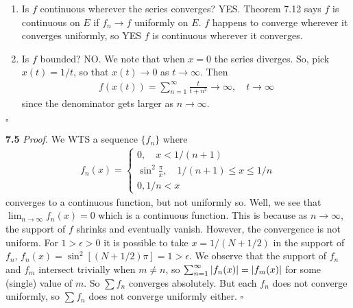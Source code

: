 \documentclass[11pt]{article}
\begin{document}
\begin{enumerate}
	
	\item Is $f$ continuous wherever the series converges? YES. Theorem 7.12 says $f$ is continuous on $E$ if $f_n \to f$ uniformly on $E$. $f$ happens to converge wherever it converges uniformly, so YES $f$ is continuous wherever it converges.  
	
	
	\item Is $f$ bounded? NO. We note that when $x=0$ the series diverges. So, pick $x(t) = 1/t$, so that $x(t) \to 0$ as $t\to \infty$. Then
	\begin{align*}
	f(x(t)) = \sum^\infty_{n=1}\frac{t}{t + n^2} \to \infty, \quad t\to \infty
	\end{align*}
	since the denominator gets larger as $n\to \infty$. 
\end{enumerate}\hfill $\square$



\noindent \textbf{7.5} 
\noindent \textit{Proof.} We WTS a sequence $\{f_n\}$ where
\begin{align*}
f_n(x) = \begin{cases}
0, \quad x<1/(n+1)\\
\sin^2\frac{\pi}{x}, \quad 1/(n+1) \leq x \leq 1/n \\
0, 1/n < x
\end{cases}
\end{align*}
converges to a continuous function, but not uniformly so. Well, we see that $\lim_{n\to \infty} f_n(x) = 0$ which is a continuous function. This is because as $n\to \infty$, the support of $f$ shrinks and eventually vanish. However, the convergence is not uniform. For $1 > \epsilon > 0$ it is possible to take $x = 1/(N+1/2)$ in the support of $f_n$, $f_n(x) = \sin^2 [(N+1/2)\pi] = 1 > \epsilon$. We observe that the support of $f_n$ and $f_m$ intersect trivially when $m\neq n$, so $\sum^\infty_{n=1} \abs{f_n(x)} = \abs{f_m(x)}$ for some (single) value of $m$. So $\sum f_n$ converges absolutely. But each $f_n$ does not converge uniformly, so $\sum f_n$ does not converge uniformly either. \hfill $\square$\\
\end{document}
